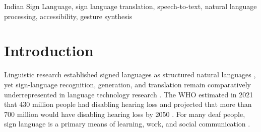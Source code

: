 \documentclass[conference]{IEEEtran}
\begin{document}
\maketitle

\begin{abstract}
A 2016 annual-report estimate from the National Association of the Deaf put India's deaf population at 18 million, although national estimates vary considerably \cite{sharma2025}. Continuous English--Indian Sign Language (ISL) resources have grown, but annotated parallel data remain limited, while dictionary-only systems cannot represent how signs connect in a sentence. This paper presents SignAction, a system that takes English text or recorded speech and produces animated ISL gesture sequences. A rule-based NLP module turns input text into gloss tokens. A file-based resolver checks those tokens against a folder of pre-recorded sign files. We gathered these sign files from free animated ISL video datasets online. If nothing matches, a synthesizer draws a stick-figure animation using sign parameters manually derived by the authors from ISLRTC dictionary videos. A FastAPI server exposes the pipeline over REST, and a Next.js frontend handles text input, audio recording, and gesture playback. On a test set of 320 English sentences, the glosser got about 93\% token-level accuracy. The time from text to first gesture frame was around 100\,ms. The whole thing runs on one CPU core with no GPU.
\end{abstract}

\begin{IEEEkeywords}
Indian Sign Language, sign language translation, speech-to-text, natural language processing, accessibility, gesture synthesis
\end{IEEEkeywords}

\section{Introduction}
\label{sec:intro}

Linguistic research established signed languages as structured natural languages \cite{stokoe1960, klima1979}, yet sign-language recognition, generation, and translation remain comparatively underrepresented in language technology research \cite{bragg2019}. The WHO estimated in 2021 that 430 million people had disabling hearing loss and projected that more than 700 million would have disabling hearing loss by 2050 \cite{who2021}. For many deaf people, sign language is a primary means of learning, work, and social communication \cite{bragg2019}.
\end{document}
